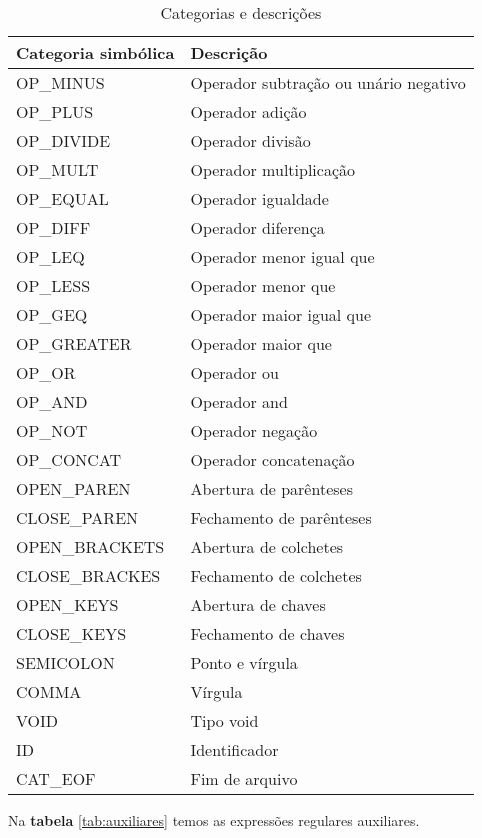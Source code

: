 \documentclass[
  12pt,				%
  oneside,			%
  a4paper,			%
  english,			%
  french,				%
  spanish,			%
  brazil,				%
]{abntex2}
\begin{document}
\begin{table}[H]
  \centering
\begin{tabular}{|l|l|}
  \hline
  Categoria simbólica & Descrição    \\ \hline
OP\_MINUS           & Operador subtração ou unário negativo \\
OP\_PLUS           & Operador adição \\
OP\_DIVIDE           & Operador divisão \\
OP\_MULT           & Operador multiplicação \\
OP\_EQUAL           & Operador igualdade \\
OP\_DIFF           & Operador diferença \\
OP\_LEQ           & Operador menor igual que \\
OP\_LESS           & Operador menor que \\
OP\_GEQ           & Operador maior igual que \\
OP\_GREATER           & Operador maior que \\
OP\_OR           & Operador ou \\
OP\_AND           & Operador and \\
OP\_NOT           & Operador negação \\
OP\_CONCAT           & Operador concatenação \\
OPEN\_PAREN           & Abertura de parênteses  \\
CLOSE\_PAREN           & Fechamento de parênteses \\
OPEN\_BRACKETS           & Abertura de colchetes  \\
CLOSE\_BRACKES           & Fechamento de colchetes \\
OPEN\_KEYS           & Abertura de chaves  \\
CLOSE\_KEYS           & Fechamento de chaves \\
SEMICOLON           & Ponto e vírgula \\
COMMA           & Vírgula \\
VOID & Tipo void \\
ID           & Identificador \\
CAT\_EOF                    & Fim de arquivo             \\ \hline
\end{tabular}
\caption{Categorias e descrições}
\label{tab:cat-desc2}
\end{table}

Na \textbf{tabela} \ref{tab:auxiliares} temos as expressões regulares
auxiliares.
\end{document}
